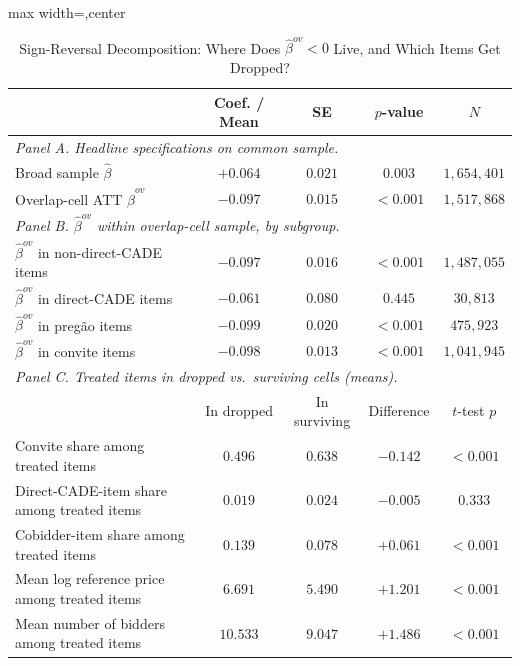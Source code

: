 \begin{table}[htbp]
\centering
\caption{Sign-Reversal Decomposition: Where Does $\widehat\beta^{ov}<0$ Live, and Which Items Get Dropped?}
\label{tab:sign_reversal_decomp}
\begin{adjustbox}{max width=\textwidth,center}
\begin{threeparttable}
\footnotesize
\begin{tabular}{lcccc}
\toprule
 & Coef. / Mean & SE & $p$-value & $N$ \\
\midrule
\multicolumn{5}{l}{\textit{Panel A. Headline specifications on common sample.}} \\
Broad sample $\widehat\beta$ & $+0.064$ & $0.021$ & $0.003$ & $1{,}654{,}401$ \\
Overlap-cell ATT $\widehat\beta^{ov}$ & $-0.097$ & $0.015$ & $<0.001$ & $1{,}517{,}868$ \\
\midrule
\multicolumn{5}{l}{\textit{Panel B. $\widehat\beta^{ov}$ within overlap-cell sample, by subgroup.}} \\
$\widehat\beta^{ov}$ in non-direct-CADE items & $-0.097$ & $0.016$ & $<0.001$ & $1{,}487{,}055$ \\
$\widehat\beta^{ov}$ in direct-CADE items & $-0.061$ & $0.080$ & $0.445$ & $30{,}813$ \\
$\widehat\beta^{ov}$ in pregão items & $-0.099$ & $0.020$ & $<0.001$ & $475{,}923$ \\
$\widehat\beta^{ov}$ in convite items & $-0.098$ & $0.013$ & $<0.001$ & $1{,}041{,}945$ \\
\midrule
\multicolumn{5}{l}{\textit{Panel C. Treated items in dropped vs.\ surviving cells (means).}} \\
 & In dropped & In surviving & Difference & $t$-test $p$ \\
Convite share among treated items & $0.496$ & $0.638$ & $-0.142$ & $<0.001$ \\
Direct-CADE-item share among treated items & $0.019$ & $0.024$ & $-0.005$ & $0.333$ \\
Cobidder-item share among treated items & $0.139$ & $0.078$ & $+0.061$ & $<0.001$ \\
Mean log reference price among treated items & $6.691$ & $5.490$ & $+1.201$ & $<0.001$ \\
Mean number of bidders among treated items & $10.533$ & $9.047$ & $+1.486$ & $<0.001$ \\
\bottomrule
\end{tabular}
\begin{tablenotes}

\end{tablenotes}
\end{threeparttable}
\end{adjustbox}
\end{table}
